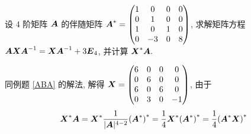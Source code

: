 \begin{example}
    设 4 阶矩阵 $\vb*{A}$ 的伴随矩阵 $\vb*{A}^*=\begin{pmatrix}
            1 & 0  & 0 & 0 \\
            0 & 1  & 0 & 0 \\
            1 & 0  & 1 & 0 \\
            0 & -3 & 0 & 8
        \end{pmatrix}$, 求解矩阵方程 $\vb*{AXA}^{-1}=\vb*{XA}^{-1}+3\vb*{E}_4$, 并计算 $\vb*{X}^*\vb*{A}.$
\end{example}
\begin{solution}
    同例题 \ref{ABA} 的解法, 解得 $\vb*{X}=\begin{pmatrix}
            6 & 0 & 0 & 0  \\
            0 & 6 & 0 & 0  \\
            6 & 0 & 6 & 0  \\
            0 & 3 & 0 & -1
        \end{pmatrix}$, 由于 $$\vb*{X}^*\vb*{A}=\vb*{X}^*\dfrac{1}{|\vb*{A}|^{4-2}}\qty(\vb*{A}^*)^*=\dfrac{1}{4}\vb*{X}^*\qty(\vb*{A}^*)^*=\dfrac{1}{4}\qty(\vb*{A}^*\vb*{X})^*$$
\end{solution}
